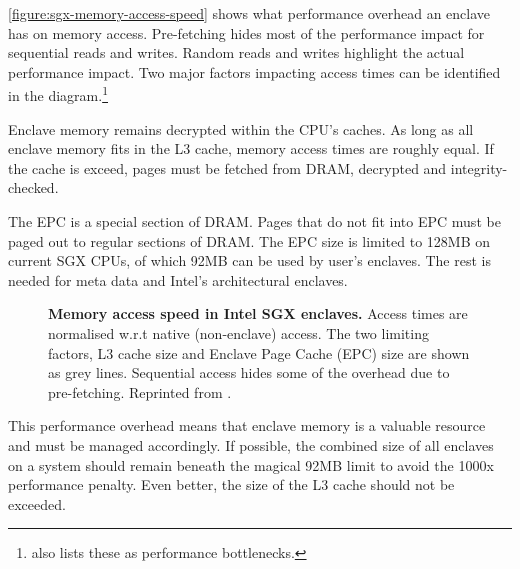 \autoref{figure:sgx-memory-access-speed} shows what performance overhead an enclave has on memory access.\label{ID_1704912531}
Pre-fetching hides most of the performance impact for sequential reads and writes.\cite[]{Arnautov2016}\label{ID_1962030152}
Random reads and writes highlight the actual performance impact.\label{ID_1830401881}
Two major factors impacting access times can be identified in the diagram.\footnote{\cite{sgx-dev} also lists these as performance bottlenecks.}\cite[]{Arnautov2016}\label{ID_334642516}
\begin{description}\label{ID_1147500560}
\item[L3 cache size:] Enclave memory remains decrypted within the CPU's caches. As long as all enclave memory fits in the L3 cache, memory access times are roughly equal. If the cache is exceed, pages must be fetched from DRAM, decrypted and integrity-checked.\label{ID_635553127}
\item[Enclave Page Cache (EPC) size:] The EPC is a special section of DRAM. Pages that do not fit into EPC must be paged out to regular sections of DRAM. The EPC size is limited to 128MB on current SGX CPUs, of which 92MB can be used by user's enclaves. The rest is needed for meta data and Intel's architectural enclaves.\label{ID_766702921}
\end{description}\label{ID_1904020196}
\begin{figure}[htbp]
\caption{\textbf{Memory access speed in Intel SGX enclaves.} Access times are normalised w.r.t native (non-enclave) access. The two limiting factors, L3 cache size and Enclave Page Cache (EPC) size are shown as grey lines. Sequential access hides some of the overhead due to pre-fetching. Reprinted from \cite{Arnautov2016}.\label{ID_1423936467}\label{figure:sgx-memory-access-speed}\label{ID_1423936467}\label{figure:sgx-memory-access-speed}}
\end{figure}


This performance overhead means that enclave memory is a valuable resource and must be managed accordingly.\label{ID_813062369}
If possible, the combined size of all enclaves on a system should remain beneath the magical 92MB limit to avoid the 1000x performance penalty.\label{ID_1432243820}
Even better, the size of the L3 cache should not be exceeded.\label{ID_62762820}

